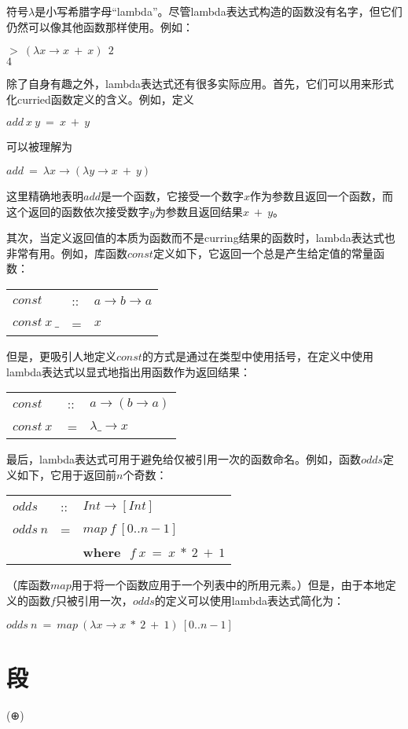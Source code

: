 符号$\lambda$是小写希腊字母“lambda”。尽管lambda表达式构造的函数没有名字，但它们仍然可以像其他函数那样使用。例如：

\noindent\hspace*{1cm} $>~(\lambda x \rightarrow x~+~x)~~2$\\
\hspace*{1cm} $4$

除了自身有趣之外，lambda表达式还有很多实际应用。首先，它们可以用来形式化curried函数定义的含义。例如，定义

\noindent\hspace*{1cm} $add~x~y~=~x~+~y$

可以被理解为

\noindent\hspace*{1cm} $add~=~\lambda x \rightarrow (\lambda y \rightarrow x~+~y)$

这里精确地表明$add$是一个函数，它接受一个数字$x$作为参数且返回一个函数，而这个返回的函数依次接受数字$y$为参数且返回结果$x~+~y$。

其次，当定义返回值的本质为函数而不是curring结果的函数时，lambda表达式也非常有用。例如，库函数$const$定义如下，它返回一个总是产生给定值的常量函数：

\begin{tabular}[t]{lll}
$const$&::&$a \rightarrow b \rightarrow a$\\
$const~x~\_$&=&$x$\\
\end{tabular}

但是，更吸引人地定义$const$的方式是通过在类型中使用括号，在定义中使用lambda表达式以显式地指出用函数作为返回结果：

\begin{tabular}[t]{lll}
$const$&::&$a \rightarrow (b \rightarrow a)$\\
$const~x~$&=&$\lambda \_ \rightarrow x$\\
\end{tabular}

最后，lambda表达式可用于避免给仅被引用一次的函数命名。例如，函数$odds$定义如下，它用于返回前$n$个奇数：

\begin{tabular}[t]{lll}
$odds$&::&$Int \rightarrow [Int]$\\
$odds~n$&=&$map~f~[0..n-1]$\\
& &\textbf{where}~$~f~x~=~x~*~2~+~1$\\
\end{tabular}

（库函数$map$用于将一个函数应用于一个列表中的所用元素。）但是，由于本地定义的函数$f$只被引用一次，$odds$的定义可以使用lambda表达式简化为：

\noindent\hspace*{1cm} $odds~n~=~map~(\lambda x \rightarrow x~*~2~+~1)~[0..n-1]$

\section{段}

(⊕)

